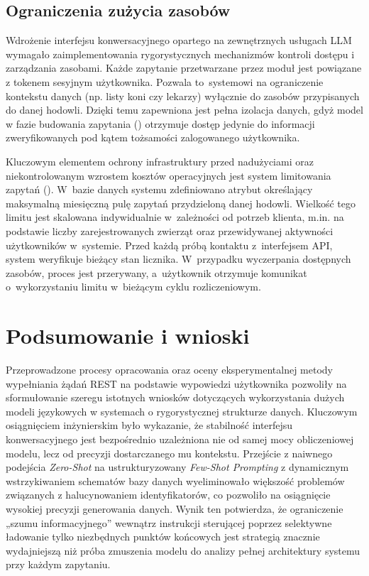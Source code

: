 \subsection{Ograniczenia zużycia zasobów}

Wdrożenie interfejsu konwersacyjnego opartego na zewnętrznych usługach LLM wymagało zaimplementowania rygorystycznych mechanizmów kontroli dostępu i zarządzania zasobami. Każde zapytanie przetwarzane przez moduł jest powiązane z tokenem sesyjnym użytkownika. Pozwala to~systemowi na ograniczenie kontekstu danych (np. listy koni czy lekarzy) wyłącznie do zasobów przypisanych do danej hodowli. Dzięki temu zapewniona jest pełna izolacja danych, gdyż model w fazie budowania zapytania () otrzymuje dostęp jedynie do informacji zweryfikowanych pod kątem tożsamości zalogowanego użytkownika.

Kluczowym elementem ochrony infrastruktury przed nadużyciami oraz niekontrolowanym wzrostem kosztów operacyjnych jest system limitowania zapytań (). W~bazie danych systemu zdefiniowano atrybut określający maksymalną miesięczną pulę zapytań przydzieloną danej hodowli. Wielkość tego limitu jest skalowana indywidualnie w~zależności od potrzeb klienta, m.in. na podstawie liczby zarejestrowanych zwierząt oraz przewidywanej aktywności użytkowników w~systemie. Przed każdą próbą kontaktu z~interfejsem API, system weryfikuje bieżący stan licznika. W~przypadku wyczerpania dostępnych zasobów, proces jest przerywany, a~użytkownik otrzymuje komunikat o~wykorzystaniu limitu w~bieżącym cyklu rozliczeniowym.

\section{Podsumowanie i wnioski}

Przeprowadzone procesy opracowania oraz oceny eksperymentalnej metody wypełniania żądań REST na podstawie wypowiedzi użytkownika pozwoliły na sformułowanie szeregu istotnych wniosków dotyczących wykorzystania dużych modeli językowych w systemach o rygorystycznej strukturze danych. Kluczowym osiągnięciem inżynierskim było wykazanie, że stabilność interfejsu konwersacyjnego jest bezpośrednio uzależniona nie od samej mocy obliczeniowej modelu, lecz od precyzji dostarczanego mu kontekstu. Przejście z naiwnego podejścia \textit{Zero-Shot} na ustrukturyzowany \textit{Few-Shot Prompting} z dynamicznym wstrzykiwaniem schematów bazy danych wyeliminowało większość problemów związanych z halucynowaniem identyfikatorów, co pozwoliło na osiągnięcie wysokiej precyzji generowania danych. Wynik ten potwierdza, że ograniczenie „szumu informacyjnego” wewnątrz instrukcji sterującej poprzez selektywne ładowanie tylko niezbędnych punktów końcowych jest strategią znacznie wydajniejszą niż próba zmuszenia modelu do analizy pełnej architektury systemu przy każdym zapytaniu.

